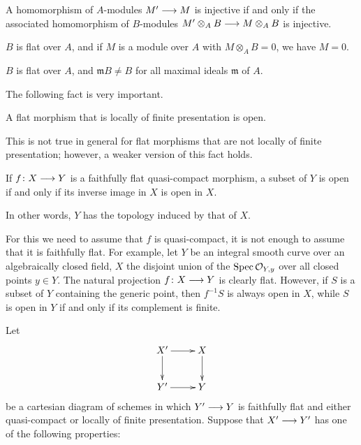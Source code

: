 \begin{1   PRELIMINARY NOTIONS}
\begin{1.1 Algebraic geometry}
\begin{proposition}
\begin{enumeratei}
\item A homomorphism of $A$-modules $M' \arr M$ is injective if and only if the associated homomorphism of $B$-modules $M' \otimes_A B \arr M \otimes_A B$ is injective.

\item $B$ is flat over $A$, and if $M$ is a module over $A$ with $M
\otimes_A B = 0$, we have $M = 0$.

\item $B$ is flat over $A$, and $\mathfrak{m}B \neq B$ for all maximal ideals $\mathfrak{m}$ of $A$. 

\end{enumeratei}
\end{proposition}

The following fact is very important.

\begin{proposition}
\label{prop:flat->open}
A flat morphism that is locally of finite presentation is open.
\end{proposition}

This is not true in general for flat morphisms that are not locally of finite presentation; however, a weaker version of this fact holds.

\begin{proposition}
\label{prop:flat->quotient-topology}
If $f \colon X \arr Y$ is a faithfully flat quasi-compact morphism, a subset of $Y$ is open if and only if its inverse image in $X$ is open in $X$.
\end{proposition}

In other words, $Y$ has the topology induced by that of $X$.

\begin{remark}\label{rmk:need-finiteness}
For this we need to assume that $f$ is quasi-compact, it is not enough to assume that it is faithfully flat. For example, let $Y$ be an integral smooth curve over an algebraically closed field, $X$ the disjoint union of the $\operatorname{Spec}\mathcal{O}_{Y,y}$ over all closed points $y \in Y$. The natural projection $f \colon X \arr Y$ is clearly flat. However, if $S$ is a subset of $Y$ containing the generic point, then $f^{-1}S$ is always open in $X$, while $S$ is open in $Y$ if and only if its complement is finite.
\end{remark}

\begin{proposition}
\label{prop:local-qcflat}
Let
   \[
   \xymatrix{
   X' \ar[r] \ar[d] &
   X \ar[d] \\
   Y' \ar[r] &
   Y
   }
   \]
be a cartesian diagram of schemes in which $Y' \arr Y$ is faithfully flat and either quasi-compact or locally of finite presentation. Suppose that $X' \arr Y'$ has one of the following properties:
\begin{enumeratei}


\end{enumeratei}
\end{proposition}
\end{1.1 Algebraic geometry}
\end{1   PRELIMINARY NOTIONS}
